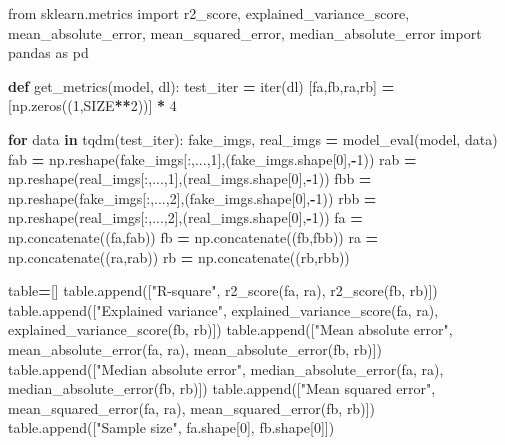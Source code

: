 \documentclass[
]{article}
\newenvironment{Shaded}{\begin{snugshade}}{\end{snugshade}}
\newcommand{\BuiltInTok}[1]{#1}
\newcommand{\ControlFlowTok}[1]{\textcolor[rgb]{0.13,0.29,0.53}{\textbf{#1}}}
\newcommand{\DecValTok}[1]{\textcolor[rgb]{0.00,0.00,0.81}{#1}}
\newcommand{\ImportTok}[1]{#1}
\newcommand{\KeywordTok}[1]{\textcolor[rgb]{0.13,0.29,0.53}{\textbf{#1}}}
\newcommand{\NormalTok}[1]{#1}
\newcommand{\OperatorTok}[1]{\textcolor[rgb]{0.81,0.36,0.00}{\textbf{#1}}}
\newcommand{\StringTok}[1]{\textcolor[rgb]{0.31,0.60,0.02}{#1}}
\begin{document}
\begin{Shaded}
\begin{Highlighting}[]
\ImportTok{from}\NormalTok{ sklearn.metrics }\ImportTok{import}\NormalTok{ r2\_score, explained\_variance\_score, mean\_absolute\_error, mean\_squared\_error, median\_absolute\_error}
\ImportTok{import}\NormalTok{ pandas }\ImportTok{as}\NormalTok{ pd}

\KeywordTok{def}\NormalTok{ get\_metrics(model, dl):}
\NormalTok{    test\_iter }\OperatorTok{=} \BuiltInTok{iter}\NormalTok{(dl)}
\NormalTok{    [fa,fb,ra,rb] }\OperatorTok{=}\NormalTok{ [np.zeros((}\DecValTok{1}\NormalTok{,SIZE}\OperatorTok{**}\DecValTok{2}\NormalTok{))] }\OperatorTok{*} \DecValTok{4}

    \ControlFlowTok{for}\NormalTok{ data }\KeywordTok{in}\NormalTok{ tqdm(test\_iter):}
\NormalTok{        fake\_imgs, real\_imgs }\OperatorTok{=}\NormalTok{ model\_eval(model, data)}
\NormalTok{        fab }\OperatorTok{=}\NormalTok{ np.reshape(fake\_imgs[:,...,}\DecValTok{1}\NormalTok{],(fake\_imgs.shape[}\DecValTok{0}\NormalTok{],}\OperatorTok{{-}}\DecValTok{1}\NormalTok{))}
\NormalTok{        rab }\OperatorTok{=}\NormalTok{ np.reshape(real\_imgs[:,...,}\DecValTok{1}\NormalTok{],(real\_imgs.shape[}\DecValTok{0}\NormalTok{],}\OperatorTok{{-}}\DecValTok{1}\NormalTok{))}
\NormalTok{        fbb }\OperatorTok{=}\NormalTok{ np.reshape(fake\_imgs[:,...,}\DecValTok{2}\NormalTok{],(fake\_imgs.shape[}\DecValTok{0}\NormalTok{],}\OperatorTok{{-}}\DecValTok{1}\NormalTok{))}
\NormalTok{        rbb }\OperatorTok{=}\NormalTok{ np.reshape(real\_imgs[:,...,}\DecValTok{2}\NormalTok{],(real\_imgs.shape[}\DecValTok{0}\NormalTok{],}\OperatorTok{{-}}\DecValTok{1}\NormalTok{))}
\NormalTok{        fa }\OperatorTok{=}\NormalTok{ np.concatenate((fa,fab))}
\NormalTok{        fb }\OperatorTok{=}\NormalTok{ np.concatenate((fb,fbb))}
\NormalTok{        ra }\OperatorTok{=}\NormalTok{ np.concatenate((ra,rab))}
\NormalTok{        rb }\OperatorTok{=}\NormalTok{ np.concatenate((rb,rbb))}

\NormalTok{    table}\OperatorTok{=}\NormalTok{[]}
\NormalTok{    table.append([}\StringTok{"R{-}square"}\NormalTok{, r2\_score(fa, ra), r2\_score(fb, rb)])}
\NormalTok{    table.append([}\StringTok{"Explained variance"}\NormalTok{, explained\_variance\_score(fa, ra), explained\_variance\_score(fb, rb)])}
\NormalTok{    table.append([}\StringTok{"Mean absolute error"}\NormalTok{, mean\_absolute\_error(fa, ra), mean\_absolute\_error(fb, rb)])}
\NormalTok{    table.append([}\StringTok{"Median absolute error"}\NormalTok{, median\_absolute\_error(fa, ra), median\_absolute\_error(fb, rb)])}
\NormalTok{    table.append([}\StringTok{"Mean squared error"}\NormalTok{, mean\_squared\_error(fa, ra), mean\_squared\_error(fb, rb)])}
\NormalTok{    table.append([}\StringTok{"Sample size"}\NormalTok{, fa.shape[}\DecValTok{0}\NormalTok{], fb.shape[}\DecValTok{0}\NormalTok{]])}


\end{Highlighting}
\end{Shaded}
\end{document}
